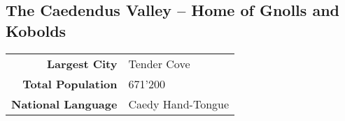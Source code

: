 \subsection{The Caedendus Valley -- Home of Gnolls and Kobolds}
\begin{tabular}{r | l}
    \textbf{Largest City} & Tender Cove\\
    \textbf{Total Population} & 671'200\\
    \textbf{National Language} & Caedy Hand-Tongue
\end{tabular}